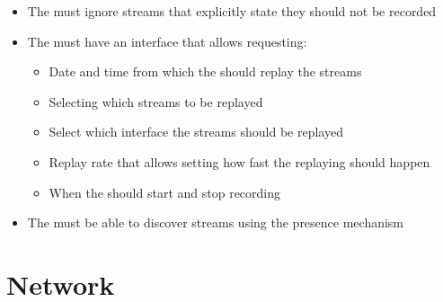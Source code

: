 \begin{itemize}
	\item The  must ignore streams that explicitly state they should not be recorded
	\item The  must have an interface that allows requesting:
	\begin{itemize}
		\item Date and time from which the  should replay the streams
		\item Selecting which streams to be replayed
		\item Select which interface the streams should be replayed
		\item Replay rate that allows setting how fast the replaying should happen
		\item When the  should start and stop recording
	\end{itemize}
	\item The  must be able to discover streams using the presence mechanism
\end{itemize}


\section{Network} \label{sec:analysis:network}

